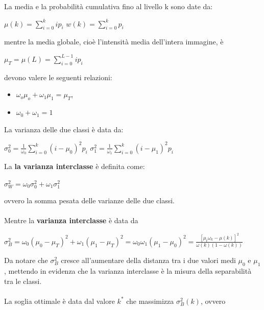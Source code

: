 La media e la probabilità cumulativa fino al livello k sono date da:

\begin{center}
    $\mu(k)=\sum_{i=0}^{k}ip_i$ $w(k)=\sum_{i=0}^{k}p_i$
\end{center}

mentre la media globale, cioè l'intensità media dell'intera immagine, è

\begin{center}
    $\mu_T=\mu(L)=\sum_{i=0}^{L-1}ip_i$
\end{center}

devono valere le seguenti relazioni:

\begin{itemize}
    \item $\omega_o \mu_o + \omega_1 \mu_1 = \mu_T$,
    \item $\omega_0 + \omega_1 = 1$
\end{itemize}

La varianza delle due classi è data da:

\begin{center}
    $\sigma^2_0 = \frac{1}{\omega_0}\sum_{i=0}^{k}(i-\mu_0)^2p_i$  $\sigma^2_1 = \frac{1}{\omega_1}\sum_{i=0}^{k}(i-\mu_1)^2p_i$
\end{center}

La \textbf{la varianza interclasse} è definita come:

\begin{center}
    $\sigma^2_W = \omega_0 \sigma^2_0 + \omega_1 \sigma^2_1$
\end{center}

ovvero la somma pesata delle varianze delle due classi.
\\\\Mentre la \textbf{varianza interclasse} è data da

\begin{center}
    $\sigma^2_B = \omega_0(\mu_0 - \mu_T)^2 + \omega_1(\mu_1 - \mu_T)^2 = \omega_0\omega_1(\mu_1-\mu_0)^2 = \frac{[\mu_t \omega_k - \mu(k)]^2}{\omega(k)(1-\omega(k))}$
\end{center}

Da notare che $\sigma^2_B$  cresce all'aumentare della distanza tra i due valori medi $\mu_0$ e $\mu_1$, mettendo in evidenza che la varianza interclasse è la misura della separabilità tra le classi.
\\\\
La soglia ottimale è data dal valore $k^*$ che massimizza $\sigma^2_B(k)$, ovvero

